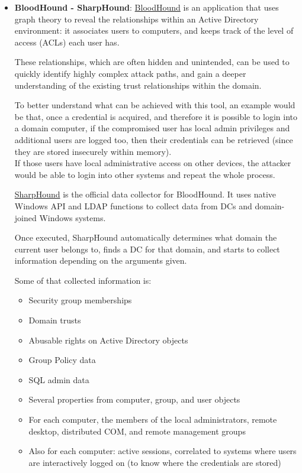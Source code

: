 \begin{itemize}
\item \textbf{BloodHound - SharpHound}: \underline{BloodHound}\cite{BloodHound} is an application that uses graph theory to reveal the relationships within an Active Directory environment: it associates users to computers, and keeps track of the level of access (ACLs) each user has. 

These relationships, which are often hidden and unintended, can be used to quickly identify highly complex attack paths, and gain a deeper understanding of the existing trust relationships within the domain. 

To better understand what can be achieved with this tool, an example would be that, once a credential is acquired, and therefore it is possible to login into a domain computer, if the compromised user has local admin privileges and additional users are logged too, then their credentials can be retrieved (since they are stored insecurely within memory).\\ If those users have local administrative access on other devices, the attacker would be able to login into other systems and repeat the whole process. 

\underline{SharpHound} is the official data collector for BloodHound\cite{SharpHound}. It uses native Windows API and LDAP functions to collect data from DCs and domain-joined Windows systems.

Once executed, SharpHound automatically determines what domain the current user belongs to, finds a DC for that domain, and starts to collect information depending on the arguments given. 

Some of that collected information is: 
\begin{itemize}
\item Security group memberships
\item Domain trusts 
\item Abusable rights on Active Directory objects
\item Group Policy data
\item SQL admin data
\item Several properties from computer, group, and user objects
\item For each computer, the members of the local administrators, remote desktop, distributed COM, and remote management groups
\item Also for each computer: active sessions, correlated to systems where users are interactively logged on (to know where the credentials are stored)
\end{itemize}


\end{itemize}
